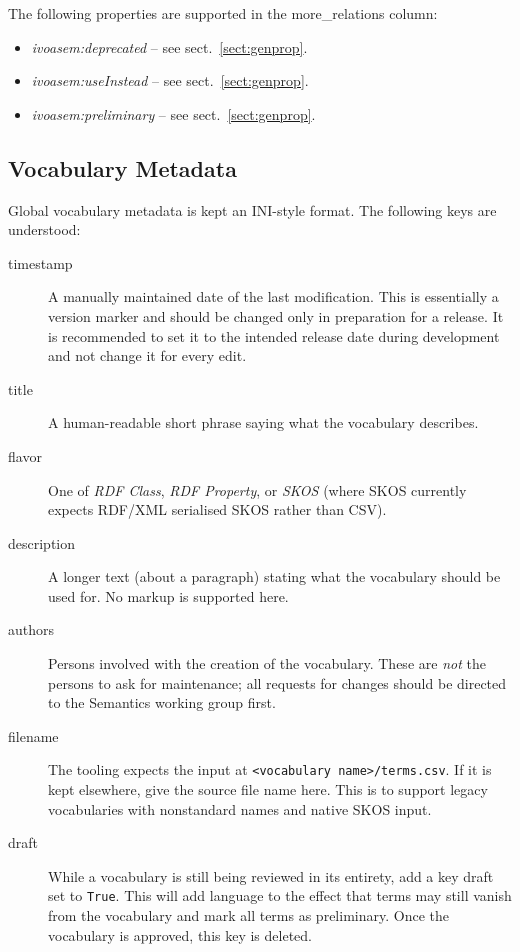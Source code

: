 \documentclass[11pt,a4paper]{ivoa}
\newcommand{\vocterm}[1]{\emph{\color{termcolor}#1}}
\begin{document}
The following properties are supported in the more\_relations
column:

\begin{itemize}
\item \vocterm{ivoasem:deprecated} -- see sect.~\ref{sect:genprop}.
\item \vocterm{ivoasem:useInstead} -- see sect.~\ref{sect:genprop}.
\item \vocterm{ivoasem:preliminary} -- see sect.~\ref{sect:genprop}.
\end{itemize}

\subsection{Vocabulary Metadata}
\label{sect:vocmeta}

Global vocabulary metadata is kept an INI-style format.  The following
keys are understood:

\begin{description}
\item[timestamp]
  A manually maintained date of the last modification.  This is
  essentially a version marker and should be changed only in preparation
  for a release.  It is recommended to set it to the intended release
  date during development and not change it for every edit.
\item[title]
  A human-readable short phrase saying what the vocabulary describes.
\item[flavor]
  One of \textit{RDF Class}, \textit{RDF Property}, or \textit{SKOS}
  (where SKOS currently expects RDF/XML serialised SKOS rather than CSV).
\item[description]
  A longer text (about a paragraph) stating what the vocabulary should
  be used for.  No markup is supported here.
\item[authors]
  Persons involved with the creation of the vocabulary.  These are \emph{not}
  the persons to ask for maintenance; all requests for changes should be
  directed to the Semantics working group first.
\item[filename]
  The tooling expects the input at
  \verb|<vocabulary name>/terms.csv|.  If it is kept elsewhere, give
  the source file name here.  This is to support legacy
  vocabularies with nonstandard names and native SKOS input.
\item[draft]
  While a vocabulary is still being reviewed in its entirety, add a key
  draft set to \texttt{True}.  This will add language to the effect that
  terms may still vanish from the vocabulary and mark all terms as
  preliminary.  Once the vocabulary is approved, this key is deleted.
\end{description}
\end{document}
